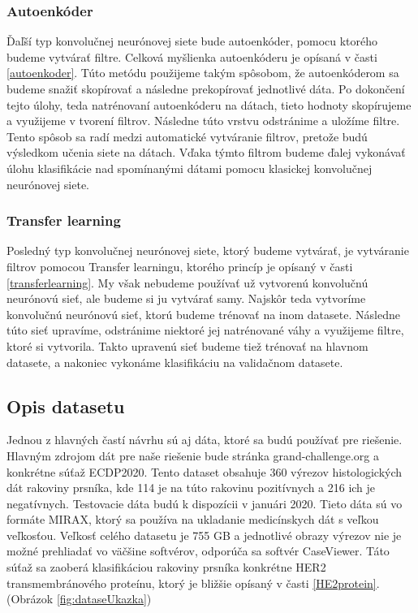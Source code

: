 \subsubsection*{Autoenkóder}
\hspace{10mm}Ďaľší typ konvolučnej neurónovej siete bude autoenkóder, pomocu ktorého budeme vytvárať filtre. Celková myšlienka autoenkóderu je opísaná v časti \ref{autoenkoder}. Túto metódu použijeme takým spôsobom, že autoenkóderom sa budeme snažiť skopírovať a následne prekopírovať jednotlivé dáta. Po dokončení tejto úlohy, teda natrénovaní autoenkóderu na dátach, tieto hodnoty skopírujeme a využijeme v tvorení filtrov. Následne túto vrstvu odstránime a uložíme filtre. Tento spôsob sa radí medzi automatické vytváranie filtrov, pretože budú výsledkom učenia siete na dátach. Vďaka týmto filtrom budeme ďalej vykonávať úlohu klasifikácie nad spomínanými dátami pomocu klasickej konvolučnej neurónovej siete.

\subsubsection*{Transfer learning}
\hspace{10mm}Posledný typ konvolučnej neurónovej siete, ktorý budeme vytvárať, je vytváranie filtrov pomocou Transfer learningu, ktorého princíp je opísaný v časti \ref{transferlearning}. My však nebudeme používať už vytvorenú konvolučnú neurónovú sieť, ale budeme si ju vytvárať samy. Najskôr teda vytvoríme konvolučnú neurónovú sieť, ktorú budeme trénovať na inom datasete. Následne túto sieť upravíme, odstránime niektoré jej natrénované váhy a využijeme filtre, ktoré si vytvorila. Takto upravenú sieť budeme tiež trénovať na hlavnom datasete, a nakoniec vykonáme klasifikáciu na validačnom datasete.  

\subsection{Opis datasetu}
\hspace{10mm}Jednou z hlavných častí návrhu sú aj dáta, ktoré sa budú používať pre riešenie. Hlavným zdrojom dát pre naše riešenie bude stránka grand-challenge.org a konkrétne súťaž ECDP2020. Tento dataset obsahuje 360 výrezov histologických dát rakoviny prsníka, kde 114 je na túto rakovinu pozitívnych a 216 ich je negatívnych. Testovacie dáta budú k dispozícii v januári 2020. Tieto dáta sú vo formáte MIRAX, ktorý sa používa na ukladanie medicínskych dát s veľkou veľkosťou. Veľkosť celého datasetu je 755 GB a jednotlivé obrazy výrezov nie je možné prehliadať vo väčšine softvérov, odporúča sa softvér CaseViewer. Táto súťaž sa zaoberá klasifikáciou rakoviny prsníka konkrétne HER2 transmembránového proteínu, ktorý je bližšie opísaný v časti \ref{HE2protein}. (Obrázok \ref{fig:dataseUkazka})

